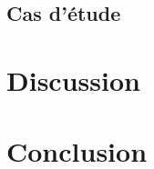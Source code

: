 \documentclass[french]{./sageo}
\begin{document}
\subsection{Cas d'étude}




\section{Discussion}




\section{Conclusion}














\end{document}
